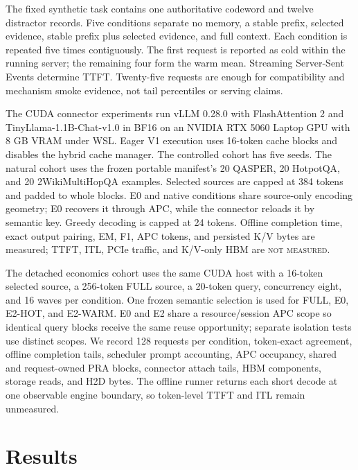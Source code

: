 \documentclass[10pt]{article}
\begin{document}
The fixed synthetic task contains one authoritative codeword and twelve
distractor records. Five conditions separate no memory, a stable prefix,
selected evidence, stable prefix plus selected evidence, and full context.
Each condition is repeated five times contiguously. The first request is
reported as cold within the running server; the remaining four form the warm
mean. Streaming Server-Sent Events determine TTFT. Twenty-five requests are
enough for compatibility and mechanism smoke evidence, not tail percentiles or
serving claims.

The CUDA connector experiments run vLLM 0.28.0 with FlashAttention 2 and
TinyLlama-1.1B-Chat-v1.0 in BF16 on an NVIDIA RTX 5060 Laptop GPU with 8 GB
VRAM under WSL. Eager V1 execution uses 16-token cache blocks and disables the
hybrid cache manager. The controlled cohort has five seeds. The natural cohort
uses the frozen portable manifest's 20 QASPER, 20 HotpotQA, and 20
2WikiMultiHopQA examples. Selected sources are capped at 384 tokens and padded
to whole blocks. E0 and native conditions share source-only encoding geometry;
E0 recovers it through APC, while the connector reloads it by semantic key.
Greedy decoding is capped at 24 tokens. Offline completion time, exact output
pairing, EM, F1, APC tokens, and persisted K/V bytes are measured; TTFT, ITL,
PCIe traffic, and K/V-only HBM are \textsc{not measured}.

The detached economics cohort uses the same CUDA host with a 16-token selected
source, a 256-token FULL source, a 20-token query, concurrency eight, and 16
waves per condition. One frozen semantic selection is used for FULL, E0,
E2-HOT, and E2-WARM. E0 and E2 share a resource/session APC scope so identical
query blocks receive the same reuse opportunity; separate isolation tests use
distinct scopes. We record 128 requests per condition, token-exact agreement,
offline completion tails, scheduler prompt accounting, APC occupancy, shared
and request-owned PRA blocks, connector attach tails, HBM components, storage
reads, and H2D bytes. The offline runner returns each short decode at one
observable engine boundary, so token-level TTFT and ITL remain unmeasured.

\section{Results}
\begin{table}[t]
\centering
\small
\caption{vLLM-Metal smoke results. TTFT is milliseconds. ``Warm cached'' is
not available per request in the SSE usage payload.}

\label{tab:vllm-smoke}
\end{table}
\end{document}
